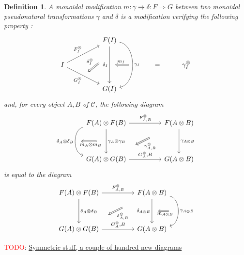 \documentclass[a4paper, 12pt, twoside,openright]{report}
\newtheorem{definition}{Definition}
\newcommand{\todo}[1]{\textcolor{red}{TODO}: \underline{#1}}
\begin{document}
\begin{definition}
A monoidal modification $m: \gamma \Rrightarrow \delta : F \Rightarrow G$ between two monoidal pseudonatural transformations $\gamma$ and $\delta$ is a modification verifying the following property : 
$$\begin{tikzcd}
&&
F(I)
\arrow[swap]{dd}[name=B, near start]{}[name=C]{\delta_I}
\arrow[bend left = 80]{dd}[name=D]{\gamma_I}
\\
I
\arrow{rru}{F^{\otimes}_{I}}
\arrow[swap]{rrd}[name=A]{G^{\otimes}_{I}}
&&
&&
=
&
\gamma^{\otimes}_I
\\
&&
G(I)
\arrow[Rightarrow,from = B,to=A, shorten >=0.3cm, shorten <=0.5cm,swap]{}{\delta^{\otimes}_{I}}
\arrow[Rightarrow,from = D,to=C, shorten >=0.3cm, shorten <=0.2cm,swap]{}{m_I}
\end{tikzcd}$$
and, for every object $A,B$ of $\mathcal{C}$, the following diagram
$$
\begin{tikzcd}
F(A) \otimes F(B)
\arrow{rr}{F^{\otimes}_{A,B}}
\arrow{dd}{\gamma_A \otimes \gamma_B}[name=A]{}
\arrow[bend right = 80,swap]{dd}{\delta_A \otimes \delta_B}[name=B]{}
&&
F(A \otimes B)
\arrow[Rightarrow,shorten >=1.0cm, shorten <=1.0cm]{ddll}{\gamma^{\otimes}_{A,B}}
\arrow{dd}{\gamma_{A \otimes B}}
\\
\\
G(A) \otimes G(B)
\arrow{rr}{G^{\otimes}_A,B}
&&
G(A \otimes B)
\arrow[Rightarrow, from=A,to=B,shorten >=0.3cm, shorten <=0.5cm]{}{m_A \otimes m_B}
\end{tikzcd}
$$
is equal to the diagram
$$
\begin{tikzcd}
F(A) \otimes F(B)
\arrow{rr}{F^{\otimes}_{A,B}}
\arrow{dd}{\delta_A \otimes \delta_B}
&&
F(A \otimes B)
\arrow[Rightarrow,shorten >=1.0cm, shorten <=1.0cm]{ddll}{\delta^{\otimes}_{A,B}}
\arrow[swap]{dd}{\delta_{A \otimes B}}[name=A]{}
\arrow[bend left = 80]{dd}{\gamma_{A \otimes B}}[name=B]{}
\\
\\
G(A) \otimes G(B)
\arrow{rr}{G^{\otimes}_A,B}
&&
G(A \otimes B)
\arrow[Rightarrow, from=B,to=A,shorten >=0.3cm, shorten <=0.5cm]{}{m_{A \otimes B}}
\end{tikzcd}
$$
\end{definition}


\todo{Symmetric stuff, a couple of hundred new diagrams}
\end{document}
